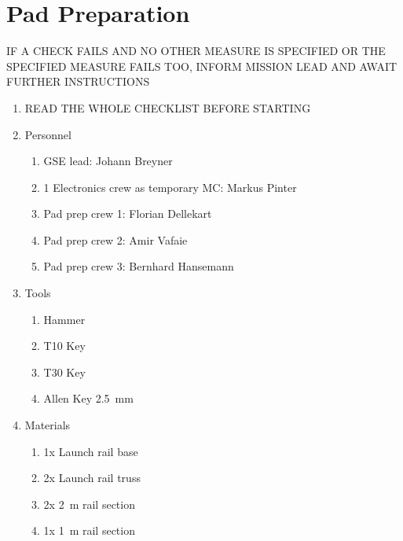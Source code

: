 \newpage
\setcounter{page}{1}
\lfoot{\thepage / \pageref{end_section_pressurant}}
\section*{Pad Preparation}


IF A CHECK FAILS AND NO OTHER MEASURE IS SPECIFIED OR THE SPECIFIED MEASURE FAILS TOO, INFORM MISSION LEAD AND AWAIT FURTHER INSTRUCTIONS

\begin{enumerate}[label=PP\arabic*.]

    \item READ THE WHOLE CHECKLIST BEFORE STARTING \checkbox

    \item \label{pad_prep_personnel} Personnel
        \begin{enumerate}[label*=\arabic*.]
            \item GSE lead: Johann Breyner
            \item 1 Electronics crew as temporary MC: Markus Pinter
            \item Pad prep crew 1: Florian Dellekart
            \item Pad prep crew 2: Amir Vafaie
            \item Pad prep crew 3: Bernhard Hansemann
        \end{enumerate}
    \item \label{pad_prep_tools} Tools
        \begin{enumerate}[label*=\arabic*.]
            \item Hammer\leftcheckbox
            \item T10 Key\leftcheckbox
            \item T30 Key\leftcheckbox
            \item Allen Key \SI{2.5}{\milli\meter}\leftcheckbox
        \end{enumerate}
    \item \label{pad_prep_materials} Materials
        \begin{enumerate}[label*=\arabic*.]
            \item 1x Launch rail base\leftcheckbox
            \item 2x Launch rail truss\leftcheckbox
            \item 2x \SI{2}{\meter} rail section\leftcheckbox
            \item 1x \SI{1}{\meter} rail section\leftcheckbox

\end{enumerate}
\end{enumerate}
